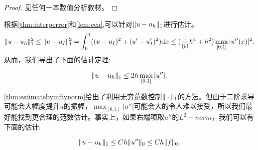 \begin{proof}
  见任何一本数值分析教材。
\end{proof}
根据\ref{thm:interperror}和\ref{lem:cea},可以针对$\|u-u_{h}\|_{1}$进行估计。
\begin{equation}
  \label{eq:ceaestimate}
  \|u-u_{h}\|_{1}^{2}\le\|u-u_{I}\|_{1}^{2}=\int_{0}^{1}((u-u_{I})^{2}+(u'-u_{I}')^{2})\mathrm{d} x\le(\frac{1}{64}h^{4}+h^{2})\max_{[0,1]}|u''(x)|^{2}.
\end{equation}
从而，我们导出了下面的估计定理:
\begin{theorem}
  \label{thm:estimatebyinftynorm}
  \begin{equation}
    \|u-u_{h}\|_{1}\le 2h\max_{[0,1]}|u''|.
  \end{equation}
\end{theorem}
\ref{thm:estimatebyinftynorm}给出了利用无穷范数控制$\|\cdot\|_{1}$的方法。但由于二阶求导可能会大幅度提升$u$的振幅，$\max_{[0,1]}|u''|$可能会大的令人难以接受，所以我们最好能找到更合理的范数估计。事实上，如果右端项取$u''$的$L^{2}-norm$，我们可以有下面的估计:
\begin{theorem}
  \label{thm:estimatebyL2}
  \begin{equation}
    \|u-u_{h}\|_{1}\le Ch\|u''\|_{0}\le Ch\|f\|_{0}.
  \end{equation}
\end{theorem}
